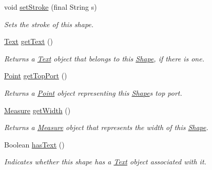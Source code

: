 \begin{DoxyCompactItemize}
void \hyperlink{classcom_1_1aarrelaakso_1_1drawl_1_1_shape_a75685cbfea36858836df8e1fb4f8b821}{set\+Stroke} (final String s)
\begin{DoxyCompactList}\small\item\em Sets the stroke of this shape. \end{DoxyCompactList}\item 
\hyperlink{classcom_1_1aarrelaakso_1_1drawl_1_1_text}{Text} \hyperlink{classcom_1_1aarrelaakso_1_1drawl_1_1_shape_a6f876978d4102974fedc5b41c93c7b26}{get\+Text} ()
\begin{DoxyCompactList}\small\item\em Returns a \hyperlink{classcom_1_1aarrelaakso_1_1drawl_1_1_text}{Text} object that belongs to this \hyperlink{classcom_1_1aarrelaakso_1_1drawl_1_1_shape}{Shape}, if there is one. \end{DoxyCompactList}\item 
\hyperlink{classcom_1_1aarrelaakso_1_1drawl_1_1_point}{Point} \hyperlink{classcom_1_1aarrelaakso_1_1drawl_1_1_shape_aed4e9caa294aacc973b7a531a960e9e5}{get\+Top\+Port} ()
\begin{DoxyCompactList}\small\item\em Returns a \hyperlink{classcom_1_1aarrelaakso_1_1drawl_1_1_point}{Point} object representing this \hyperlink{classcom_1_1aarrelaakso_1_1drawl_1_1_shape}{Shape}\textquotesingle{}s top port. \end{DoxyCompactList}\item 
\hyperlink{classcom_1_1aarrelaakso_1_1drawl_1_1_measure}{Measure} \hyperlink{classcom_1_1aarrelaakso_1_1drawl_1_1_shape_a3e2c58984f1bcbc2e9e86cf30868561e}{get\+Width} ()
\begin{DoxyCompactList}\small\item\em Returns a \hyperlink{classcom_1_1aarrelaakso_1_1drawl_1_1_measure}{Measure} object that represents the width of this \hyperlink{classcom_1_1aarrelaakso_1_1drawl_1_1_shape}{Shape}. \end{DoxyCompactList}\item 
Boolean \hyperlink{classcom_1_1aarrelaakso_1_1drawl_1_1_shape_a037a5515b2a6e1df1d1981aa5516e78e}{has\+Text} ()
\begin{DoxyCompactList}\small\item\em Indicates whether this shape has a \hyperlink{classcom_1_1aarrelaakso_1_1drawl_1_1_text}{Text} object associated with it. \end{DoxyCompactList}\end{DoxyCompactItemize}
